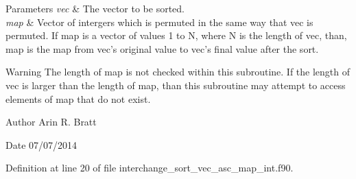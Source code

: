 \begin{DoxyParams}{Parameters}
{\em vec} & The vector to be sorted.\\
\hline
{\em map} & Vector of intergers which is permuted in the same way that vec is permuted. If map is a vector of values 1 to N, where N is the length of vec, than, map is the map from vec's original value to vec's final value after the sort.\\
\hline
\end{DoxyParams}
\begin{DoxyWarning}{Warning}
The length of map is not checked within this subroutine. If the length of vec is larger than the length of map, than this subroutine may attempt to access elements of map that do not exist.
\end{DoxyWarning}
\begin{DoxyAuthor}{Author}
Arin R. Bratt 
\end{DoxyAuthor}
\begin{DoxyDate}{Date}
07/07/2014 
\end{DoxyDate}


Definition at line 20 of file interchange\-\_\-sort\-\_\-vec\-\_\-asc\-\_\-map\-\_\-int.\-f90.

